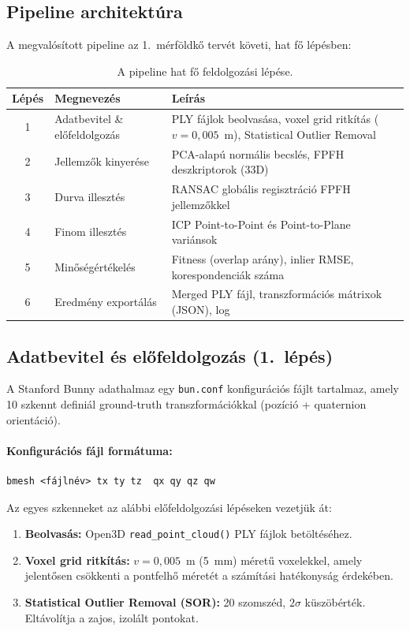 \documentclass[12pt,a4paper]{article}
\begin{document}
\subsection{Pipeline architektúra}

A megvalósított pipeline az 1.~mérföldkő tervét követi, hat fő lépésben:

\begin{table}[H]
\centering
\begin{tabular}{clp{8cm}}
\toprule
\textbf{Lépés} & \textbf{Megnevezés} & \textbf{Leírás} \\
\midrule
1 & Adatbevitel \& előfeldolgozás & PLY fájlok beolvasása, voxel grid ritkítás ($v = 0{,}005$~m), Statistical Outlier Removal \\
2 & Jellemzők kinyerése & PCA-alapú normális becslés, FPFH deszkriptorok (33D) \\
3 & Durva illesztés & RANSAC globális regisztráció FPFH jellemzőkkel \\
4 & Finom illesztés & ICP Point-to-Point és Point-to-Plane variánsok \\
5 & Minőségértékelés & Fitness (overlap arány), inlier RMSE, korespondenciák száma \\
6 & Eredmény exportálás & Merged PLY fájl, transzformációs mátrixok (JSON), log \\
\bottomrule
\end{tabular}
\caption{A pipeline hat fő feldolgozási lépése.}
\end{table}

\subsection{Adatbevitel és előfeldolgozás (1.~lépés)}

A Stanford Bunny adathalmaz egy \texttt{bun.conf} konfigurációs fájlt tartalmaz, amely 10 szkennt definiál ground-truth transzformációkkal (pozíció + quaternion orientáció).

\paragraph{Konfigurációs fájl formátuma:}
\begin{lstlisting}[language={}]
bmesh <fájlnév> tx ty tz  qx qy qz qw
\end{lstlisting}

Az egyes szkenneket az alábbi előfeldolgozási lépéseken vezetjük át:

\begin{enumerate}[nosep]
    \item \textbf{Beolvasás:} Open3D \texttt{read\_point\_cloud()} PLY fájlok betöltéséhez.
    \item \textbf{Voxel grid ritkítás:} $v = 0{,}005$~m (5~mm) méretű voxelekkel, amely jelentősen csökkenti a pontfelhő méretét a számítási hatékonyság érdekében.
    \item \textbf{Statistical Outlier Removal (SOR):} 20 szomszéd, $2\sigma$ küszöbérték. Eltávolítja a zajos, izolált pontokat.
\end{enumerate}
\end{document}

